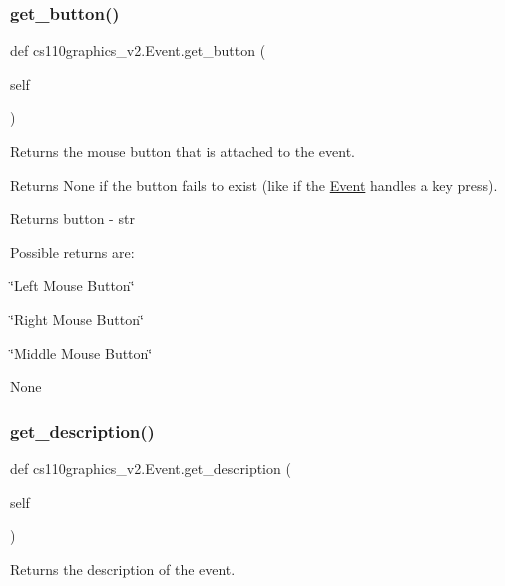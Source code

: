 \subsubsection{\texorpdfstring{get\_button()}{get\_button()}}
{\footnotesize\ttfamily def cs110graphics\+\_\+v2.\+Event.\+get\+\_\+button (\begin{DoxyParamCaption}\item[{}]{self }\end{DoxyParamCaption})}



Returns the mouse button that is attached to the event. 

Returns {\ttfamily None} if the button fails to exist (like if the \mbox{\hyperlink{classcs110graphics__v2_1_1Event}{Event}} handles a key press). \begin{DoxyReturn}{Returns}
button -\/ str
\end{DoxyReturn}
Possible returns are\+:
\begin{DoxyItemize}
\item \char`\"{}\+Left Mouse Button\char`\"{}
\item \char`\"{}\+Right Mouse Button\char`\"{}
\item \char`\"{}\+Middle Mouse Button\char`\"{}
\item None 
\end{DoxyItemize}\mbox{\label{classcs110graphics__v2_1_1Event_ac948aac9242ad8933ae741227eae72bf}} 
\subsubsection{\texorpdfstring{get\_description()}{get\_description()}}
{\footnotesize\ttfamily def cs110graphics\+\_\+v2.\+Event.\+get\+\_\+description (\begin{DoxyParamCaption}\item[{}]{self }\end{DoxyParamCaption})}



Returns the description of the event. 

